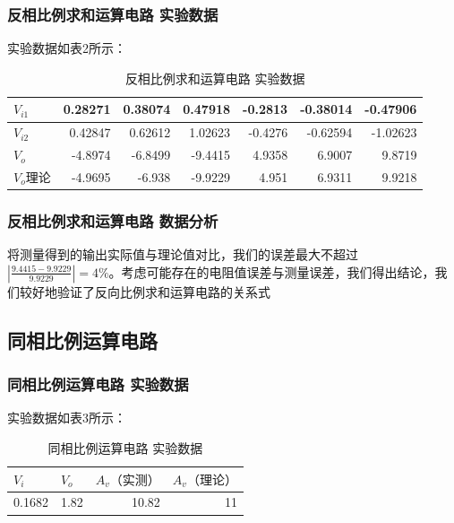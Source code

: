 \documentclass[UTF8]{article}
\begin{document}
\subsubsection{反相比例求和运算电路 实验数据}
实验数据如表2所示：
\begin{table}[htbp]
	\centering
	\caption{反相比例求和运算电路 实验数据}
	\begin{tabular}{|l|r|r|r|r|r|r|}
		\toprule
		$V_{i1}$ & 0.28271 & 0.38074 & 0.47918 & -0.2813 & -0.38014 & -0.47906 \\
		\midrule
		$V_{i2}$ & 0.42847 & 0.62612 & 1.02623 & -0.4276 & -0.62594 & -1.02623 \\
		\midrule
		$V_{o}$ & -4.8974 & -6.8499 & -9.4415 & 4.9358 & 6.9007 & 9.8719 \\
		\midrule
		$V_{o}理论$ & -4.9695 & -6.938 & -9.9229 & 4.951 & 6.9311 & 9.9218 \\
		\bottomrule
	\end{tabular}%
	\label{tab2}%
\end{table}%
\subsubsection{反相比例求和运算电路 数据分析}
将测量得到的输出实际值与理论值对比，我们的误差最大不超过$|\frac{9.4415-9.9229}{9.9229}| = 4\% $。考虑可能存在的电阻值误差与测量误差，我们得出结论，我们较好地验证了反向比例求和运算电路的关系式

\subsection{同相比例运算电路}
\subsubsection{同相比例运算电路 实验数据}
实验数据如表3所示：
\begin{table}[htbp]
	\centering
	\caption{同相比例运算电路 实验数据}
	\begin{tabular}{|r|r|r|r|}
		\toprule
		\multicolumn{1}{|l|}{$V_i$} & \multicolumn{1}{l|}{$V_o$} & \multicolumn{1}{l|}{$A_v（实测）$} & \multicolumn{1}{l|}{$A_v（理论）$} \\
		\midrule
		0.1682 & 1.82  & 10.82 & 11 \\
		\bottomrule
	\end{tabular}%
	\label{tab:addlabel}%
\end{table}%
\end{document}
